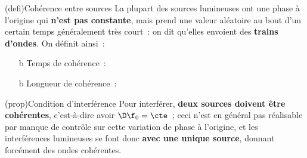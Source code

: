 \documentclass[../../main/main.tex]{subfiles}
\begin{document}
\begin{tcb}[breakable](defi){Cohérence entre sources}
	La plupart des sources lumineuses ont une phase à l'origine qui \textbf{n'est
		pas constante}, mais prend une valeur aléatoire au bout d'un certain temps
	généralement très court~: on dit qu'elles envoient des \textbf{trains
		d'ondes}. On définit ainsi~:
	\begin{itemize}
		\item[b]{Temps de cohérence}~: 
		\item[b]{Longueur de cohérence}~:  \end{itemize}
\end{tcb}

\begin{tcb*}(prop){Condition d'interférence}
	Pour interférer, \textbf{deux sources doivent être cohérentes}, c'est-à-dire
	avoir $\D\f_0 = \cte$~; ceci n'est en général pas réalisable par manque de
	contrôle sur cette variation de phase à l'origine, et les interférences
	lumineuses se font donc \textbf{avec une unique source}, donnant forcément des
	ondes cohérentes.
\end{tcb*}
\end{document}
